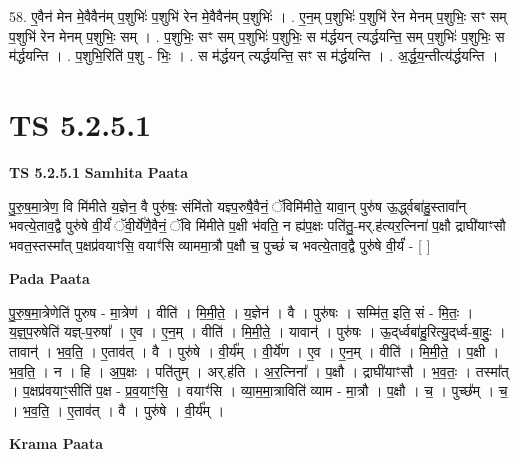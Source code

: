 \documentclass[17pt]{extarticle}
\begin{document}
58. ए॒वैन॑ मेन मे॒वैवैन॑म् प॒शुभिः॑ प॒शुभि॑ रेन मे॒वैवैन॑म् प॒शुभिः॑ । . ए॒न॒म् प॒शुभिः॑ प॒शुभि॑ रेन मेनम् प॒शुभिः॒ सꣳ सम् प॒शुभि॑ रेन मेनम् प॒शुभिः॒ सम् । . प॒शुभिः॒ सꣳ सम् प॒शुभिः॑ प॒शुभिः॒ स म॑र्द्धयन् त्यर्द्धयन्ति॒ सम् प॒शुभिः॑ प॒शुभिः॒ स म॑र्द्धयन्ति । . प॒शुभि॒रिति॑ प॒शु - भिः॒ । . स म॑र्द्धयन् त्यर्द्धयन्ति॒ सꣳ स म॑र्द्धयन्ति । . अ॒र्द्ध॒य॒न्तीत्य॑र्द्धयन्ति । \newline
\pagebreak
{}

\section{ TS 5.2.5.1 }

\textbf{TS 5.2.5.1 } \newline
\textbf{Samhita Paata} \newline

पु॒रु॒ष॒मा॒त्रेण॒ वि मि॑मीते य॒ज्ञेन॒ वै पुरु॑षः॒ संमि॑तो यज्ञ्प॒रुषै॒वैनं॒ ॅविमि॑मीते॒ यावा॒न् पुरु॑ष ऊ॒र्द्ध्वबा॑हु॒स्तावा᳚न् भवत्ये॒ताव॒द्वै पुरु॑षे वी॒र्यं॑ ॅवी॒र्ये॑णै॒वैनं॒ ॅवि मि॑मीते प॒क्षी भ॑वति॒ न ह्य॑प॒क्षः पति॑तु॒-मर्.ह॑त्यर॒त्निना॑ प॒क्षौ द्राघी॑याꣳसौ भवत॒स्तस्मा᳚त् प॒क्षप्र॑वयाꣳसि॒ वयाꣳ॑सि व्याममा॒त्रौ प॒क्षौ च॒ पुच्छं॑ च भवत्ये॒ताव॒द्वै पुरु॑षे वी॒र्यं॑ - [  ] \newline

\textbf{Pada Paata} \newline

पु॒रु॒ष॒मा॒त्रेणेति॑ पुरुष - मा॒त्रेण॑ । वीति॑ । मि॒मी॒ते॒ । य॒ज्ञेन॑ । वै । पुरु॑षः । सम्मि॑त॒ इति॒ सं - मि॒तः॒ । य॒ज्ञ्॒प॒रुषेति॑ यज्ञ्-प॒रुषा᳚ । ए॒व । ए॒न॒म् । वीति॑ । मि॒मी॒ते॒ । यावान्॑ । पुरु॑षः । ऊ॒द्‌र्ध्वबा॑हु॒रित्यु॒द्‌र्ध्व-बा॒हुः॒ । तावान्॑ । भ॒व॒ति॒ । ए॒ताव॑त् । वै । पुरु॑षे । वी॒र्य᳚म् । वी॒र्ये॑ण । ए॒व । ए॒न॒म् । वीति॑ । मि॒मी॒ते॒ । प॒क्षी । भ॒व॒ति॒ । न । हि । अ॒प॒क्षः । पति॑तुम् । अर्.ह॑ति । अ॒र॒त्निना᳚ । प॒क्षौ । द्राघी॑याꣳसौ । भ॒व॒तः॒ । तस्मा᳚त् । प॒क्षप्र॑वयाꣳ॒॒सीति॑ प॒क्ष - प्र॒व॒याꣳ॒॒सि॒ । वयाꣳ॑सि । व्या॒म॒मा॒त्राविति॑ व्याम - मा॒त्रौ । प॒क्षौ । च॒ । पुच्छ᳚म् । च॒ । भ॒व॒ति॒ । ए॒ताव॑त् । वै । पुरु॑षे । वी॒र्य᳚म् ।  \newline


\textbf{Krama Paata} \newline
\end{document}
